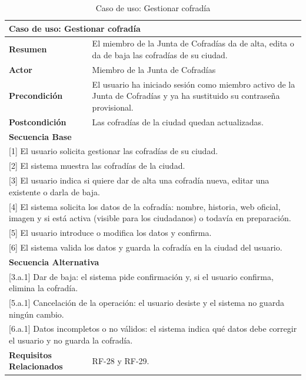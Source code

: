 \begin{table}[h!]
    \centering
    \renewcommand{\arraystretch}{1.5}

    \begin{tabular}{|p{4cm}|p{11cm}|}
        \hline
        \multicolumn{2}{|l|}{\textbf{Caso de uso: Gestionar cofradía}} \\
        \hline
        \textbf{Resumen} & El miembro de la Junta de Cofradías da de alta, edita o da de baja las cofradías de su ciudad. \\
        \hline
        \textbf{Actor} & Miembro de la Junta de Cofradías \\
        \hline
        \textbf{Precondición} & El usuario ha iniciado sesión como miembro activo de la Junta de Cofradías y ya ha sustituido su contraseña provisional. \\
        \hline
        \textbf{Postcondición} & Las cofradías de la ciudad quedan actualizadas. \\
        \hline
        \multicolumn{2}{|l|}{\textbf{Secuencia Base}} \\
        \hline
        \multicolumn{2}{|p{15cm}|}{ [1] El usuario solicita gestionar las cofradías de su ciudad. } \\
        \hline
        \multicolumn{2}{|p{15cm}|}{ [2] El sistema muestra las cofradías de la ciudad. } \\
        \hline
        \multicolumn{2}{|p{15cm}|}{ [3] El usuario indica si quiere dar de alta una cofradía nueva, editar una existente o darla de baja. } \\
        \hline
        \multicolumn{2}{|p{15cm}|}{ [4] El sistema solicita los datos de la cofradía: nombre, historia, web oficial, imagen y si está activa (visible para los ciudadanos) o todavía en preparación. } \\
        \hline
        \multicolumn{2}{|p{15cm}|}{ [5] El usuario introduce o modifica los datos y confirma. } \\
        \hline
        \multicolumn{2}{|p{15cm}|}{ [6] El sistema valida los datos y guarda la cofradía en la ciudad del usuario. } \\
        \hline
        \multicolumn{2}{|l|}{\textbf{Secuencia Alternativa}} \\
        \hline
        \multicolumn{2}{|p{15cm}|}{ [3.a.1] Dar de baja: el sistema pide confirmación y, si el usuario confirma, elimina la cofradía. } \\
        \hline
        \multicolumn{2}{|p{15cm}|}{ [5.a.1] Cancelación de la operación: el usuario desiste y el sistema no guarda ningún cambio. } \\
        \hline
        \multicolumn{2}{|p{15cm}|}{ [6.a.1] Datos incompletos o no válidos: el sistema indica qué datos debe corregir el usuario y no guarda la cofradía. } \\
        \hline
        \textbf{Requisitos Relacionados} & RF-28 y RF-29. \\
        \hline
    \end{tabular}
    \caption{Caso de uso: Gestionar cofradía}
\end{table}


